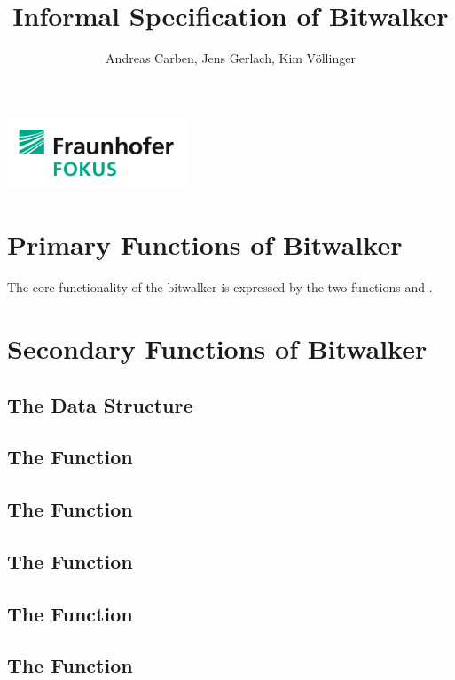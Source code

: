 \documentclass[a4paper]{scrartcl}
\title{Informal Specification of Bitwalker}
\author{Andreas Carben, Jens Gerlach, Kim Völlinger}
\begin{document}
\maketitle
\tableofcontents
\listoffixmes

\thispagestyle{empty}

\vfill

\begin{center}
\includegraphics[width=0.40\textwidth]{figures/FOKUS_4C_CMYK.pdf}
\end{center}

\newpage


\section{Primary Functions of Bitwalker}

The core functionality of the bitwalker is expressed
by the two functions \peek and \poke.





\clearpage
\section{Secondary Functions of Bitwalker}


\subsection{The Data Structure }
\subsection{The Function }
\subsection{The Function }
\subsection{The Function }
\subsection{The Function }
\subsection{The Function }
\end{document}
